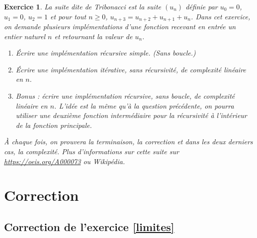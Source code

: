 \documentclass[11pt,a4paper]{article}
\newtheorem{ex}{Exercice}
\begin{document}
\begin{ex}\label{tribonacci}
La suite dite de \og Tribonacci\fg{} est la suite $(u_n)$ définie par $u_0=0$, $u_1 = 0$, $u_2 = 1$ et pour tout $n\geq 0$, $u_{n+3} = u_{n+2}+u_{n+1}+u_n$.
Dans cet exercice, on demande plusieurs implémentations d'une fonction recevant en entrée un entier naturel $n$ et retournant la valeur de $u_n$.
\begin{enumerate}
\item Écrire une implémentation récursive simple. (Sans boucle.)
\item Écrire une implémentation itérative, sans récursivité, de complexité linéaire en $n$.
\item Bonus : écrire une implémentation récursive, sans boucle, de complexité linéaire en $n$. L'idée est la même qu'à la question précédente, on pourra utiliser une deuxième fonction intermédiaire pour la récursivité à l'intérieur de la fonction principale.
\end{enumerate}
À chaque fois, on prouvera la terminaison, la correction et dans les deux derniers cas, la complexité.
Plus d'informations sur cette suite sur \url{https://oeis.org/A000073} ou Wikipédia.
\end{ex}

\newpage

\section*{Correction}

\subsection*{Correction de l'exercice \ref{limites}}
\end{document}
